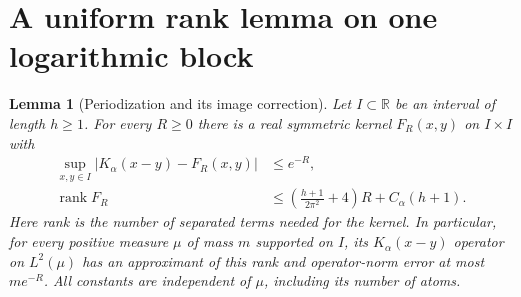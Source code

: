 \documentclass[11pt]{article}
\newtheorem{lemma}[theorem]{Lemma}
\newcommand{\rank}{\operatorname{rank}}
\newcommand{\R}{\mathbb R}
\begin{document}
\section{A uniform rank lemma on one logarithmic block}\label{sec:block}
\begin{lemma}[Periodization and its image correction]\label{lem:block}
Let $I\subset\R$ be an interval of length $h\ge1$. For every $R\ge0$
there is a real symmetric kernel $F_R(x,y)$ on $I\times I$ with
\begin{align}
 \sup_{x,y\in I}|K_\alpha(x-y)-F_R(x,y)|&\le e^{-R},
                                                        \label{eq:kernelerror}\\
 \rank F_R&\le
       \left(\frac{h+1}{2\pi^2}+4\right)R+C_\alpha(h+1).
                                                        \label{eq:blockrank}
\end{align}
Here rank is the number of separated terms needed for the kernel.
In particular, for every positive measure $\mu$ of mass $m$ supported
on $I$, its $K_\alpha(x-y)$ operator on $L^2(\mu)$ has an approximant
of this rank and operator-norm error at most $m e^{-R}$.
All constants are independent of $\mu$, including its number of atoms.
\end{lemma}
\end{document}

